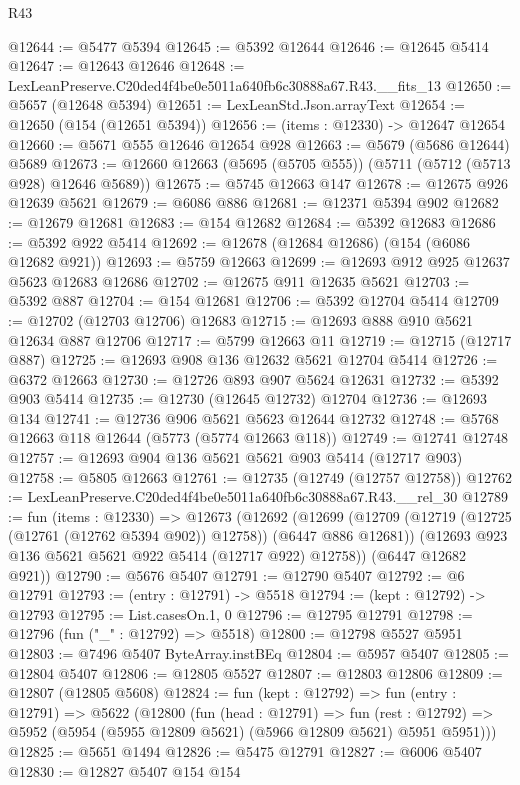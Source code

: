 \begin{lexlean}{R43}
\begin{coremodule}
@12644 := @5477 @5394
@12645 := @5392 @12644
@12646 := @12645 @5414
@12647 := @12643 @12646
@12648 := LexLeanPreserve.C20ded4f4be0e5011a640fb6c30888a67.R43.__fits_13
@12650 := @5657 (@12648 @5394)
@12651 := LexLeanStd.Json.arrayText
@12654 := @12650 (@154 (@12651 @5394))
@12656 := (items : @12330) -> @12647 @12654
@12660 := @5671 @555 @12646 @12654 @928
@12663 := @5679 (@5686 @12644) @5689
@12673 := @12660 @12663 (@5695 (@5705 @555)) (@5711 (@5712 (@5713 @928) @12646 @5689))
@12675 := @5745 @12663 @147
@12678 := @12675 @926 @12639 @5621
@12679 := @6086 @886
@12681 := @12371 @5394 @902
@12682 := @12679 @12681
@12683 := @154 @12682
@12684 := @5392 @12683
@12686 := @5392 @922 @5414
@12692 := @12678 (@12684 @12686) (@154 (@6086 @12682 @921))
@12693 := @5759 @12663
@12699 := @12693 @912 @925 @12637 @5623 @12683 @12686
@12702 := @12675 @911 @12635 @5621
@12703 := @5392 @887
@12704 := @154 @12681
@12706 := @5392 @12704 @5414
@12709 := @12702 (@12703 @12706) @12683
@12715 := @12693 @888 @910 @5621 @12634 @887 @12706
@12717 := @5799 @12663 @11
@12719 := @12715 (@12717 @887)
@12725 := @12693 @908 @136 @12632 @5621 @12704 @5414
@12726 := @6372 @12663
@12730 := @12726 @893 @907 @5624 @12631
@12732 := @5392 @903 @5414
@12735 := @12730 (@12645 @12732) @12704
@12736 := @12693 @134
@12741 := @12736 @906 @5621 @5623 @12644 @12732
@12748 := @5768 @12663 @118 @12644 (@5773 (@5774 @12663 @118))
@12749 := @12741 @12748
@12757 := @12693 @904 @136 @5621 @5621 @903 @5414 (@12717 @903)
@12758 := @5805 @12663
@12761 := @12735 (@12749 (@12757 @12758))
@12762 := LexLeanPreserve.C20ded4f4be0e5011a640fb6c30888a67.R43.__rel_30
@12789 := fun (items : @12330) =>
  @12673
    (@12692
      (@12699
        (@12709 (@12719 (@12725 (@12761 (@12762 @5394 @902)) @12758)) (@6447 @886 @12681))
        (@12693 @923 @136 @5621 @5621 @922 @5414 (@12717 @922) @12758))
      (@6447 @12682 @921))
@12790 := @5676 @5407
@12791 := @12790 @5407
@12792 := @6 @12791
@12793 := (entry : @12791) -> @5518
@12794 := (kept : @12792) -> @12793
@12795 := List.casesOn.{1, 0}
@12796 := @12795 @12791
@12798 := @12796 (fun ("_" : @12792) => @5518)
@12800 := @12798 @5527 @5951
@12803 := @7496 @5407 ByteArray.instBEq
@12804 := @5957 @5407
@12805 := @12804 @5407
@12806 := @12805 @5527
@12807 := @12803 @12806
@12809 := @12807 (@12805 @5608)
@12824 := fun (kept : @12792) =>
  fun (entry : @12791) =>
  @5622
    (@12800
      (fun (head : @12791) =>
      fun (rest : @12792) => @5952 (@5954 (@5955 @12809 @5621) (@5966 @12809 @5621) @5951 @5951)))
@12825 := @5651 @1494
@12826 := @5475 @12791
@12827 := @6006 @5407
@12830 := @12827 @5407 @154 @154

\end{coremodule}
\end{lexlean}
